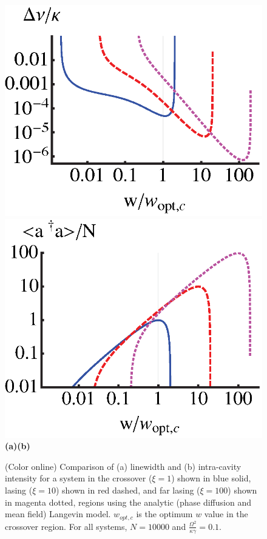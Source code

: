 \documentclass[aps,
twocolumn,
showpacs,
superscriptaddress,groupedaddress]{revtex4}
\begin{document}
\begin{figure}
\begin{center}
	\includegraphics[scale =0.415] {LinewidthComparisonLangevin.eps}
	\hspace{-4mm} \includegraphics[scale =0.415] {adaComparisonLangevin.eps}\\
	\hspace{6mm}\textbf{(a)}\hspace{37mm}\textbf{(b)} \hspace{35mm}
\end{center}
		\vspace{-5mm}
\caption{(Color online) Comparison of (a) linewidth and (b) intra-cavity
intensity for a system in the crossover ($\xi=1$) shown in blue solid,
lasing ($\xi=10$) shown in red dashed, and far lasing ($\xi=100$) shown
in magenta dotted, regions using the analytic (phase diffusion and mean
field) Langevin model. $w_{opt,c}$ is the optimum $w$ value in the
crossover region. For all systems, $N=10000$ and $\frac{\Omega^2}{\kappa
\gamma}=0.1$.}
\label{LWadaComparison}
\end{figure}
\end{document}
